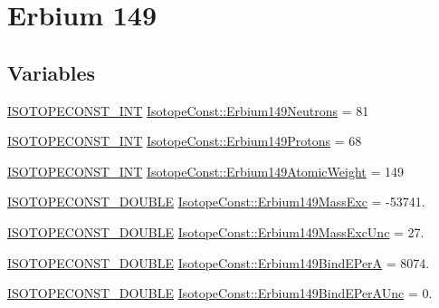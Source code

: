 \hypertarget{group___isotope_const-_erbium-_er149}{}\section{Erbium 149}
\label{group___isotope_const-_erbium-_er149}
\subsection*{Variables}
\begin{DoxyCompactItemize}
\item 
\mbox{\hyperlink{group___isotope_const-_macros_ga5f18360b3e99483a35c32d789e62621c}{I\+S\+O\+T\+O\+P\+E\+C\+O\+N\+S\+T\+\_\+\+I\+NT}} \mbox{\hyperlink{group___isotope_const-_erbium-_er149_ga78586c841a41f5e26b693b6ca8a90666}{Isotope\+Const\+::\+Erbium149\+Neutrons}} = 81
\item 
\mbox{\hyperlink{group___isotope_const-_macros_ga5f18360b3e99483a35c32d789e62621c}{I\+S\+O\+T\+O\+P\+E\+C\+O\+N\+S\+T\+\_\+\+I\+NT}} \mbox{\hyperlink{group___isotope_const-_erbium-_er149_gabfb21a83ee35003fc195870f1fa616d0}{Isotope\+Const\+::\+Erbium149\+Protons}} = 68
\item 
\mbox{\hyperlink{group___isotope_const-_macros_ga5f18360b3e99483a35c32d789e62621c}{I\+S\+O\+T\+O\+P\+E\+C\+O\+N\+S\+T\+\_\+\+I\+NT}} \mbox{\hyperlink{group___isotope_const-_erbium-_er149_ga060c70c674c724630a8c399fe359dd7b}{Isotope\+Const\+::\+Erbium149\+Atomic\+Weight}} = 149
\item 
\mbox{\hyperlink{group___isotope_const-_macros_ga8f45a7272ce02c0b4c65c44636ed719a}{I\+S\+O\+T\+O\+P\+E\+C\+O\+N\+S\+T\+\_\+\+D\+O\+U\+B\+LE}} \mbox{\hyperlink{group___isotope_const-_erbium-_er149_ga61b0aea21a70977a3318f86268d203de}{Isotope\+Const\+::\+Erbium149\+Mass\+Exc}} = -\/53741.
\item 
\mbox{\hyperlink{group___isotope_const-_macros_ga8f45a7272ce02c0b4c65c44636ed719a}{I\+S\+O\+T\+O\+P\+E\+C\+O\+N\+S\+T\+\_\+\+D\+O\+U\+B\+LE}} \mbox{\hyperlink{group___isotope_const-_erbium-_er149_ga0b3ed45f9432223882f837024d5d37d3}{Isotope\+Const\+::\+Erbium149\+Mass\+Exc\+Unc}} = 27.
\item 
\mbox{\hyperlink{group___isotope_const-_macros_ga8f45a7272ce02c0b4c65c44636ed719a}{I\+S\+O\+T\+O\+P\+E\+C\+O\+N\+S\+T\+\_\+\+D\+O\+U\+B\+LE}} \mbox{\hyperlink{group___isotope_const-_erbium-_er149_ga1fefa6b985279e5869ac325d0dc29f41}{Isotope\+Const\+::\+Erbium149\+Bind\+E\+PerA}} = 8074.
\item 
\mbox{\hyperlink{group___isotope_const-_macros_ga8f45a7272ce02c0b4c65c44636ed719a}{I\+S\+O\+T\+O\+P\+E\+C\+O\+N\+S\+T\+\_\+\+D\+O\+U\+B\+LE}} \mbox{\hyperlink{group___isotope_const-_erbium-_er149_ga36d91b2316e9cabc126aec959bbd4cb8}{Isotope\+Const\+::\+Erbium149\+Bind\+E\+Per\+A\+Unc}} = 0.

\end{DoxyCompactItemize}
